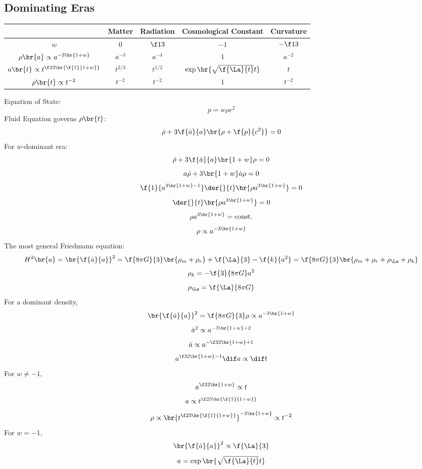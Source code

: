\documentclass{article}
\begin{document}
\subsection{Dominating Eras}

\begin{center}
\begin{tabular}{|c|c|c|c|c|}
    \hline
     & Matter & Radiation & Cosmological Constant & Curvature \\
    \hline
    $w$ & $0$ & $\f13$ & $-1$ & $-\f13$ \\
    \hline
    $\rho\br{a} \propto a^{-3\br{1 + w}}$ & $a^{-3}$ & $a^{-4}$ & $1$ & $a^{-2}$ \\
    \hline
    $a\br{t} \propto t^{\f23\br{\f{1}{1 + w}}}$ & $t^{2/3}$ & $t^{1/2}$ & $\exp\br{\sqrt{\f{\La}{t}} t}$ & $t$ \\
    \hline
    $\rho\br{t} \propto t^{-2}$ & $t^{-2}$ & $t^{-2}$ & $1$ & $t^{-2}$ \\
    \hline
\end{tabular}
\end{center}

Equation of State:
\[ p = w\rho c^2 \]
Fluid Equation governs $\rho\br{t}$:
\[ \dot \rho + 3 \f{\dot a}{a} \br{\rho + \f{p}{c^2}} = 0 \]
For $w$-dominant era:
\[ \dot \rho + 3 \f{\dot a}{a} \br{1 + w}\rho = 0 \]
\[ a \dot \rho + 3\br{1 + w} \dot a \rho = 0 \]
\[ \f{1}{a^{3\br{1 + w} - 1}} \der{}{t}\br{\rho a^{3\br{1 + w}}} = 0 \]
\[ \der{}{t}\br{\rho a^{3\br{1 + w}}} = 0 \]
\[ \rho a^{3\br{1 + w}} = \text{const.} \]
\[ \rho \propto a^{-3\br{1 + w}} \]
The most general Friedmann equation:
\[ H^2 \br{a} = \br{\f{\dot a}{a}}^2 = \f{8 \pi G}{3} \br{\rho_m + \rho_r} + \f{\La}{3} - \f{k}{a^2} = \f{8 \pi G}{3} \br{\rho_m + \rho_r + \rho_\La + \rho_k} \]
\[ \rho_k = - \f{3}{8 \pi G} a^2 \]
\[ \rho_\La = \f{\La}{8 \pi G} \]
For a dominant density,
\[ \br{\f{\dot a}{a}}^2 = \f{8 \pi G}{3} \rho \propto a^{-3\br{1 + w}} \]
\[ \dot a^2 \propto a^{-3\br{1 + w} +2} \]
\[ \dot a \propto a^{-\f32\br{1 + w} + 1} \]
\[ a^{\f32\br{1 + w} - 1} \dif a \propto \dif t  \]
For $w \neq -1$,
\[ a^{\f32\br{1 + w}} \propto t  \]
\[ a \propto t^{\f23\br{\f{1}{1 + w}}}  \]
\[ \rho \propto \br{t^{\f23\br{\f{1}{1 + w}}}}^{-3\br{1 + w}} \propto t^{-2} \]
For $w = -1$,
\[ \br{\f{\dot a}{a}}^2 \propto \f{\La}{3}  \]
\[ a = \exp\br{\sqrt{\f{\La}{t}} t} \]
\end{document}
